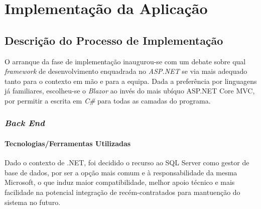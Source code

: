 





\chapter{Implementação da Aplicação}
    
    \section{Descrição do Processo de Implementação}

            O arranque da fase de implementação inaugurou-se com um debate sobre qual \textit{framework} de desenvolvimento enquadrada no \textit{ASP.NET} se via mais adequado tanto para o contexto em mão e para a equipa. Dada a preferência por linguagens já familiares, escolheu-se o \textit{Blazor} ao invés do mais ubíquo ASP.NET Core MVC, por permitir a escrita em \textit{C\#} para todas as camadas do programa.   
                
        \newpage
        \subsection{\textit{Back End}}

            \subsubsection{Tecnologias/Ferramentas Utilizadas}
                    Dado o contexto de .NET, foi decidido o recurso ao SQL Server como gestor de base de dados, por ser a opção mais comum e à responsabilidade da mesma Microsoft, o que induz maior compatibilidade, melhor apoio técnico e mais facilidade na potencial integração de recém-contratados para mantuenção do sistema no futuro. 
        
